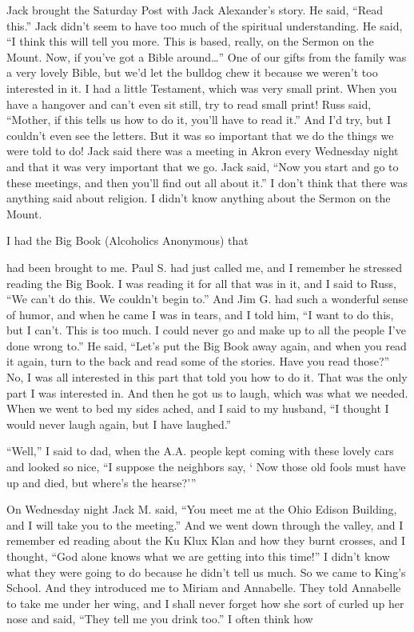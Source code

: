 \begin{biblechapter}
Jack brought the Saturday Post with Jack Alexander’s story. He said, “Read this.” Jack didn’t seem to have too much of the spiritual understanding. He said, “I think this will tell you more. This is based, really, on the Sermon on the Mount. Now, if you’ve got a Bible around…” One of our gifts from the family was a very lovely Bible, but we’d let the bulldog chew it because we weren’t too interested in it. I had a little Testament, which was very small print. When you have a hangover and can’t even sit still, try to read small print! Russ said, “Mother, if this tells us how to do it, you’ll have to read it.” And I’d try, but I couldn’t even see the letters. But it was so important that we do the things we were told to do! Jack said there was a meeting in Akron every Wednesday night and that it was very important that we go. Jack said, “Now you start and go to these meetings, and then you’ll find out all about it.” I don’t think that there was anything said about religion. I didn’t know anything about the Sermon on the Mount.

I had the Big Book (Alcoholics Anonymous) that

had been brought to me. Paul S. had just called me, and I remember he stressed reading the Big Book. I was reading it for all that was in it, and I said to Russ, “We can’t do this. We couldn’t begin to.” And Jim G. had such a wonderful sense of humor, and when he came I was in tears, and I told him, “I want to do this, but I can’t. This is too much. I could never go and make up to all the people I’ve done wrong to.” He said, “Let’s put the Big Book away again, and when you read it again, turn to the back and read some of the stories. Have you read those?” No, I was all interested in this part that told you how to do it. That was the only part I was interested in. And then he got us to laugh, which was what we needed. When we went to bed my sides ached, and I said to my husband, “I thought I would never laugh again, but I have laughed.”

“Well,” I said to dad, when the A.A. people kept coming with these lovely cars and looked so nice, “I suppose the neighbors say, ‘ Now those old fools must have up and died, but where’s the hearse?'”

On Wednesday night Jack M. said, “You meet me at the Ohio Edison Building, and I will take you to the meeting.” And we went down through the valley, and I remember ed reading about the Ku Klux Klan and how they burnt crosses, and I thought, “God alone knows what we are getting into this time!” I didn’t know what they were going to do because he didn’t tell us much. So we came to King’s School. And they introduced me to Miriam and Annabelle. They told Annabelle to take me under her wing, and I shall never forget how she sort of curled up her nose and said, “They tell me you drink too.” I often think how


\end{biblechapter}
